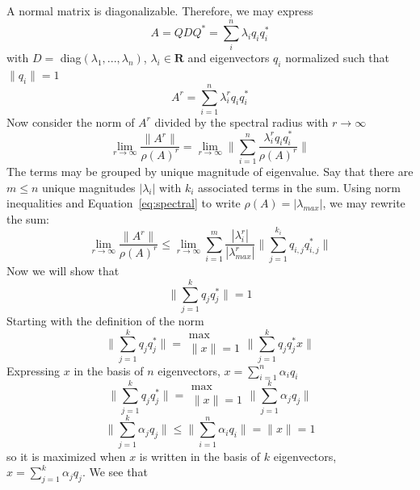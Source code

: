 \documentclass[11pt]{article} %
\begin{document}
\subsection{} %
A normal matrix is diagonalizable. Therefore, we may express
\begin{equation}
A = Q D Q^* = \sum_i^n \lambda_i q_i q_i^*
\end{equation}
with $D = $ diag$(\lambda_1, ... , \lambda_n)$, $\lambda_i \in \mathbf{R}$ and eigenvectors $q_i$ normalized such that $\|q_i\| = 1$
\begin{equation}
A^r  = \sum_{i=1}^n \lambda_i^r q_i q_i^*
\end{equation}
Now consider the norm of $A^r$ divided by the spectral radius with $r \rightarrow \infty$
\begin{equation}
\lim_{r \rightarrow \infty} \frac{\| A^r \|}{\rho(A)^r}=\lim_{r \rightarrow \infty} \| \sum_{i=1}^n \frac{\lambda_i^r q_i q_i^*}{\rho(A)^r} \|
\end{equation}
 The terms may be grouped by unique magnitude of eigenvalue. Say that  there are $m \le n$ unique magnitudes  $|\lambda_i|$ with  $k_i$ associated terms in the sum. Using norm inequalities and Equation~\ref{eq:spectral} to write $\rho(A) = | \lambda_{max} |$, we may rewrite the sum:
\begin{equation}
\lim_{r \rightarrow \infty} \frac{\| A^r \|}{\rho(A)^r} \le \lim_{r \rightarrow \infty}  \sum_{i=1}^m \frac{| \lambda_i^r | }{| \lambda_{max}^r |} \|\sum_{j=1}^{k_i} q_{i,j} q_{i,j}^* \| 
\end{equation}
Now we will show that
\begin{equation}
\| \sum_{j=1}^{k} q_{j} q_{j}^* \| =1
\end{equation}
Starting with the definition of the norm
\begin{equation}
 \|  \sum_{j=1}^{k} q_j q_j^* \| = \substack{\max \\ \|x\|=1} \| \sum_{j=1}^{k} q_j q_j^* x \|
\end{equation} 
Expressing $x$ in the basis of $n$ eigenvectors, $x = \sum_{i=1}^n \alpha_i q_i $
\begin{equation}
\|  \sum_{j=1}^{k} q_j q_j^* \| = \substack{\max \\ \|x\|=1} \| \sum_{j=1}^{k} \alpha_j q_j \|
\end{equation}
\begin{equation}
\| \sum_{j=1}^{k} \alpha_j q_j \| \le \| \sum_{i=1}^n \alpha_i q_i \| = \| x \| = 1
\end{equation}
so it is maximized when $x$ is written in the basis of $k$ eigenvectors, $x =  \sum_{j=1}^{k} \alpha_j q_j$. We see that 
\end{document}
